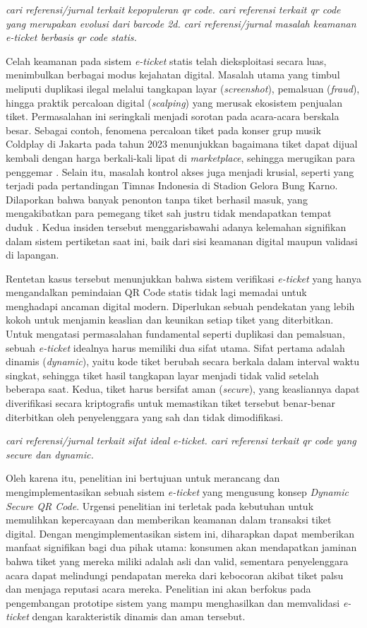 \textit{cari referensi/jurnal terkait kepopuleran qr code. cari referensi terkait qr code yang merupakan evolusi dari barcode 2d. cari referensi/jurnal masalah keamanan e-ticket berbasis qr code statis.}

Celah keamanan pada sistem \textit{e-ticket} statis telah dieksploitasi secara luas, menimbulkan berbagai modus kejahatan digital. Masalah utama yang timbul meliputi duplikasi ilegal melalui tangkapan layar (\textit{screenshot}), pemalsuan (\textit{fraud}), hingga praktik percaloan digital (\textit{scalping}) yang merusak ekosistem penjualan tiket. Permasalahan ini seringkali menjadi sorotan pada acara-acara berskala besar. Sebagai contoh, fenomena percaloan tiket pada konser grup musik Coldplay di Jakarta pada tahun 2023 menunjukkan bagaimana tiket dapat dijual kembali dengan harga berkali-kali lipat di \textit{marketplace}, sehingga merugikan para penggemar \cite{Pamela2023}. Selain itu, masalah kontrol akses juga menjadi krusial, seperti yang terjadi pada pertandingan Timnas Indonesia di Stadion Gelora Bung Karno. Dilaporkan bahwa banyak penonton tanpa tiket berhasil masuk, yang mengakibatkan para pemegang tiket sah justru tidak mendapatkan tempat duduk \cite{Kurniawan2024}. Kedua insiden tersebut menggarisbawahi adanya kelemahan signifikan dalam sistem pertiketan saat ini, baik dari sisi keamanan digital maupun validasi di lapangan.

Rentetan kasus tersebut menunjukkan bahwa sistem verifikasi \textit{e-ticket} yang hanya mengandalkan pemindaian QR Code statis tidak lagi memadai untuk menghadapi ancaman digital modern. Diperlukan sebuah pendekatan yang lebih kokoh untuk menjamin keaslian dan keunikan setiap tiket yang diterbitkan. Untuk mengatasi permasalahan fundamental seperti duplikasi dan pemalsuan, sebuah \textit{e-ticket} idealnya harus memiliki dua sifat utama. Sifat pertama adalah dinamis (\textit{dynamic}), yaitu kode tiket berubah secara berkala dalam interval waktu singkat, sehingga tiket hasil tangkapan layar menjadi tidak valid setelah beberapa saat. Kedua, tiket harus bersifat aman (\textit{secure}), yang keasliannya dapat diverifikasi secara kriptografis untuk memastikan tiket tersebut benar-benar diterbitkan oleh penyelenggara yang sah dan tidak dimodifikasi.

\textit{cari referensi/jurnal terkait sifat ideal e-ticket. cari referensi terkait qr code yang secure dan dynamic.}

Oleh karena itu, penelitian ini bertujuan untuk merancang dan mengimplementasikan sebuah sistem \textit{e-ticket} yang mengusung konsep \textit{Dynamic Secure QR Code}. Urgensi penelitian ini terletak pada kebutuhan untuk memulihkan kepercayaan dan memberikan keamanan dalam transaksi tiket digital. Dengan mengimplementasikan sistem ini, diharapkan dapat memberikan manfaat signifikan bagi dua pihak utama: konsumen akan mendapatkan jaminan bahwa tiket yang mereka miliki adalah asli dan valid, sementara penyelenggara acara dapat melindungi pendapatan mereka dari kebocoran akibat tiket palsu dan menjaga reputasi acara mereka. Penelitian ini akan berfokus pada pengembangan prototipe sistem yang mampu menghasilkan dan memvalidasi \textit{e-ticket} dengan karakteristik dinamis dan aman tersebut.

